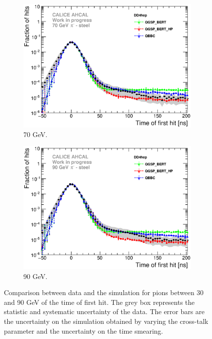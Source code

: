 \begin{figure}[htbp!]
  \hfill
  \begin{subfigure}[t]{0.49\textwidth}
    \centering
    \includegraphics[width=1\textwidth]{../Thesis_Plots/Timing/Pions/Plots/ComparisonToSim/Comparison_SimData_Pion70GeV_LateClusters_DD4hep.eps}
    \caption{70 GeV.} \label{fig:dNdt_SimData_70GeV_DD4hep}
  \end{subfigure}
  \hfill
  \begin{subfigure}[t]{0.49\textwidth}
    \centering
    \includegraphics[width=1\textwidth]{../Thesis_Plots/Timing/Pions/Plots/ComparisonToSim/Comparison_SimData_Pion90GeV_LateClusters_DD4hep.eps}
    \caption{90 GeV.} \label{fig:dNdt_SimData_90GeV_DD4hep}
  \end{subfigure}
  \caption{Comparison between data and the \ddhep simulation for pions between 30 and 90 GeV of the time of first hit. The grey box represents the statistic and systematic uncertainty of the data. The error bars are the uncertainty on the \ddhep simulation obtained by varying the cross-talk parameter and the uncertainty on the time smearing.}
\end{figure}


